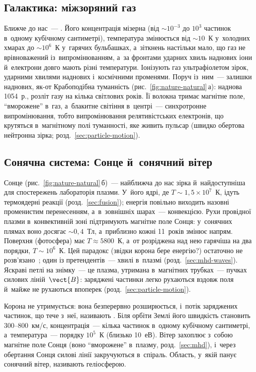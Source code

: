 \subsection*{Галактика: міжзоряний газ}
Ближче до нас~--- . Його концентрація мізерна (від $\sim10^{-3}$ до $10^{3}$ частинок в~одному кубічному сантиметрі), температура змінюється від $\sim10$~К у~холодних хмарах до $\sim10^{6}$~К у~гарячих
бульбашках, а~зіткнень настільки мало, що газ не врівноважений із~випромінюванням, а~за фронтами ударних хвиль наднових іони й~електрони довго мають різні температури. Іонізують газ ультрафіолетом зірок, ударними хвилями
наднових і~космічними променями. Поруч із~ним~--- залишки наднових, як-от Крабоподібна туманність (рис.~\ref{fig:nature-natural}\,а): наднова 1054~р., розліт газу на кілька світлових років.
Її волокна тримає магнітне поле, \enquote{вморожене} в~газ, а~блакитне світіння в~центрі~--- синхротронне випромінювання, тобто випромінювання релятивістських електронів, що крутяться в~магнітному полі туманності, яке живить пульсар (швидко обертова нейтронна зірка; розд.~\ref{sec:particle-motion}).

\subsection*{Сонячна система: Сонце й~сонячний вітер}

Сонце (рис.~\ref{fig:nature-natural}\,б)~--- найближча до нас зірка й~найдоступніша для спостережень лабораторія плазми.
У~його ядрі, де $T\sim1{,}5\times10^{7}$~К, ідуть термоядерні реакції (розд.~\ref{sec:fusion}); енергія повільно виходить назовні променистим перенесенням,
а~в~зовнішніх шарах~--- конвекцією. Рухи провідної плазми в~конвективній зоні підтримують магнітне поле Сонця: у~сонячних плямах
воно досягає $\sim0{,}4$~Тл, а~приблизно кожні 11~років змінює напрям. Поверхня (фотосфера) має $T\approx5800$~К, а~от розріджена 
над нею гарячіша на два порядки, $T\sim10^6$~К. Цей парадокс (звідки корона бере енергію?) остаточно не розв'язано~\cite{klimchuk2015key}; один із претендентів~--- хвилі в~плазмі (розд.~\ref{sec:mhd-waves}).
Яскраві петлі на знімку~--- це плазма, утримана в~магнітних трубках~--- пучках силових ліній~$\vect{B}$: заряджені частинки легко рухаються вздовж поля й~майже не рухаються впоперек
(розд.~\ref{sec:particle-motion}).

Корона не утримується: вона безперервно розширюється, і~потік заряджених частинок, що тече з~неї, називають
. Біля орбіти Землі його швидкість становить $300$--$800$~км/с, концентрація~--- кілька частинок
в~одному кубічному сантиметрі, а~температура~--- порядку $10^{5}$~К (близько 10~еВ). Вітер захоплює з~собою магнітне поле Сонця (воно \enquote{вморожене} в~плазму, розд.~\ref{sec:mhd}),
і~через обертання Сонця силові лінії закручуються в~спіраль. Область, у~якій панує сонячний вітер, називають геліосферою.

